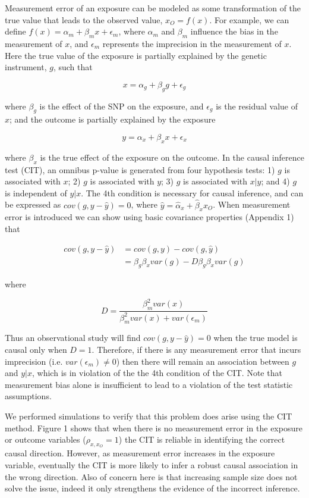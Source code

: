\documentclass[]{article}
\begin{document}
Measurement error of an exposure can be modeled as some transformation
of the true value that leads to the observed value, \(x_O=f(x)\). For
example, we can define \(f(x) = \alpha_m + \beta_m x + \epsilon_m\),
where \(\alpha_m\) and \(\beta_m\) influence the bias in the measurement
of \(x\), and \(\epsilon_m\) represents the imprecision in the
measurement of \(x\). Here the true value of the exposure is partially
explained by the genetic instrument, \(g\), such that

\[
x = \alpha_g + \beta_g g + \epsilon_g
\]

where \(\beta_g\) is the effect of the SNP on the exposure, and
\(\epsilon_g\) is the residual value of \(x\); and the outcome is
partially explained by the exposure

\[
y = \alpha_x + \beta_x x + \epsilon_x
\]

where \(\beta_x\) is the true effect of the exposure on the outcome. In
the causal inference test (CIT), an omnibus p-value is generated from
four hypothesis tests: 1) \(g\) is associated with \(x\); 2) \(g\) is
associated with \(y\); 3) \(g\) is associated with \(x|y\); and 4) \(g\)
is independent of \(y|x\). The 4th condition is necessary for causal
inference, and can be expressed as \(cov(g, y - \hat{y}) = 0\), where
\(\hat{y} = \hat{\alpha}_x + \hat{\beta}_x x_O\). When measurement error
is introduced we can show using basic covariance properties (Appendix 1)
that

\[
\begin{aligned}
cov(g, y - \hat{y}) & = cov(g, y) - cov(g, \hat{y})  \\
                    & = \beta_g \beta_x var(g) - D\beta_g \beta_x var(g)
\end{aligned}
\]

where

\[
D = \frac{\beta^2_m var(x)} {\beta^2_m var(x) + var(\epsilon_m)}
\]

Thus an observational study will find \(cov(g, y - \hat{y}) = 0\) when
the true model is causal only when \(D = 1\). Therefore, if there is any
measurement error that incurs imprecision (i.e.
\(var(\epsilon_m) \neq 0\)) then there will remain an association
between \(g\) and \(y|x\), which is in violation of the the 4th
condition of the CIT. Note that measurement bias alone is insufficient
to lead to a violation of the test statistic assumptions.

We performed simulations to verify that this problem does arise using
the CIT method. Figure 1 shows that when there is no measurement error
in the exposure or outcome variables (\(\rho_{x, x_O}=1\)) the CIT is
reliable in identifying the correct causal direction. However, as
measurement error increases in the exposure variable, eventually the CIT
is more likely to infer a robust causal association in the wrong
direction. Also of concern here is that increasing sample size does not
solve the issue, indeed it only strengthens the evidence of the
incorrect inference.
\end{document}
